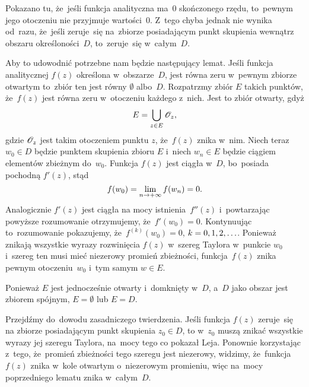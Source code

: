 \documentclass[a4paper,11pt]{article}
\begin{document}
\vspace{\spaceFour}


\start {} Pokazano tu, że~jeśli funkcja analityczna ma~0
skończonego rzędu, to~pewnym jego otoczeniu nie przyjmuje wartości~0.
Z~tego chyba jednak nie wynika od~razu, że~jeśli zeruje~się na~zbiorze
posiadającym punkt skupienia wewnątrz obszaru określoności~$D$,
to~zeruje~się w~całym~$D$.

Aby to udowodnić potrzebne nam będzie następujący lemat. Jeśli funkcja
analitycznej $f( z )$ określona w~obszarze~$D$, jest równa zeru
w~pewnym zbiorze otwartym to~zbiór ten jest równy $\emptyset$
albo~$D$. Rozpatrzmy zbiór $E$ takich punktów, że~$f( z )$ jest równa
zeru w~otoczeniu każdego z~nich. Jest to zbiór otwarty, gdyż
\begin{equation}
  \label{eq:Leja-37}
  E = \bigcup_{ z \in E } \mathcal{O}_{ z },
\end{equation}
gdzie $\mathcal{O}_{ z }$ jest takim otoczeniem punktu $z$, że~$f( z )$ znika
w~nim. Niech teraz $w_{ 0 } \in D$ będzie punktem skupienia zbioru $E$
i~niech $w_{ n } \in E$ będzie ciągiem elementów zbieżnym
do~$w_{ 0 }$. Funkcja $f( z )$ jest ciągła w~$D$, bo~posiada pochodną
$f'( z )$, stąd
\begin{equation}
  \label{eq:Leja-38}
  f( w_{ 0 } ) = \lim\limits_{ n \to +\infty } f( w_{ n } ) = 0.
\end{equation}
Analogicznie $f'( z )$ jest ciągła na mocy istnienia~$f''( z )$
i~powtarzając powyższe rozumowanie otrzymujemy,
że~$f'( w_{ 0 } ) = 0$. Kontynuując to~rozumowanie pokazujemy,
że~$f^{ ( k ) }( w_{ 0 } ) = 0$, $k = 0, 1, 2, \ldots$. Ponieważ znikają
wszystkie wyrazy rozwinięcia $f( z )$ w~szereg Taylora w~punkcie
$w_{ 0 }$ i~szereg ten musi mieć niezerowy promień zbieżności,
funkcja~$f( z )$ znika pewnym otoczeniu~$w_{ 0 }$ i~tym samym
$w \in E$.

Ponieważ $E$ jest jednocześnie otwarty i~domknięty w~$D$, a~$D$ jako
obszar jest zbiorem spójnym, $E = \emptyset$ lub $E = D$.

Przejdźmy do~dowodu zasadniczego twierdzenia. Jeśli funkcja $f( z )$
zeruje~się na zbiorze posiadającym punkt skupienia $z_{ 0 } \in D$, to
w~$z_{ 0 }$ muszą znikać wszystkie wyrazy jej szeregu Taylora, na~mocy
tego co pokazał Leja. Ponownie korzystając z~tego, że~promień
zbieżności tego szeregu jest niezerowy, widzimy, że~funkcja~$f( z )$
znika w~kole otwartym o~niezerowym promieniu, więc na~mocy
poprzedniego lematu znika w~całym~$D$.

\vspace{\spaceFour}
\end{document}
